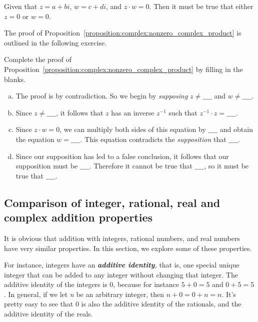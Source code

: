 \begin{prop}\label{proposition:complex:nonzero_complex_product}
Given that $z = a+bi$, $w=c+di$, and $z \cdot w = 0$. Then it must be true that either $z=0$ or $w=0$.
\end{prop}
The proof of Proposition~\ref{proposition:complex:nonzero_complex_product} is outlined in the following exercise.

\begin{exercise}\label{exercise:complex:12}
Complete the proof of Proposition~\ref{proposition:complex:nonzero_complex_product} by filling in the blanks.

\begin{enumerate}[(a)]
\item The proof is by contradiction. So we begin by \emph{supposing} $z \neq \_\_\_\_$  and $w \neq \_\_\_\_$.
\item 
Since $z \neq \_\_\_\_ $, it follows that $z$ has an inverse $z^{-1}$ such that $z^{-1} \cdot z = \_\_\_\_$.
\item
Since $z \cdot w = 0$, we can multiply both sides of this equation by $ \_\_\_\_$ and obtain the equation 
$w = \_\_\_\_$. This equation contradicts the \emph{supposition} that $\_\_\_\_$.
\item
Since our supposition has led to a false conclusion, it follows that our supposition must be $\_\_\_\_$. Therefore it cannot be true that $\_\_\_\_$, so it must be true that $\_\_\_\_$.
\end{enumerate}
\end{exercise}


\subsection{Comparison of integer, rational, real and complex addition properties}

It is obvious that addition with integers, rational numbers, and
real numbers have very similar properties. In this section, we explore some of these properties.

For instance, integers have an \textbf{\emph{additive identity}}\emph{,
}that is, one special unique integer that can be added to any integer
without changing that integer. The additive identity of the integers
is 0, because for instance $5+0=5$ and $0+5=5$. In general, if we
let \emph{n }be an arbitrary integer, then $n+0=0+n=n$. It's pretty
easy to see that 0 is also the additive identity of the rationals,
and the additive identity of the reals.

